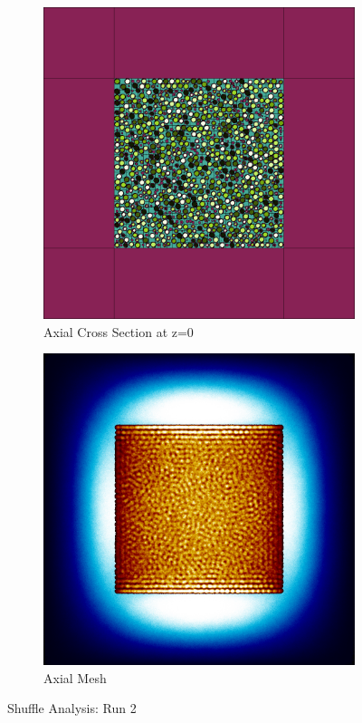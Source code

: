 \begin{figure}[H]
\begin{subfigure}{0.45\textwidth}
  \includegraphics[width=0.95\linewidth]{figures/2345601/2345601-v}
  \caption{Axial Cross Section at z=0 }
  \label{fig:2345601-v}
\end{subfigure}
%
\begin{subfigure}{0.45\textwidth}
  \includegraphics[width=0.95\linewidth]{figures/2345601/2345601-vm}
  \caption{Axial Mesh}
  \label{fig:2345601-vm}
\end{subfigure}
%
\caption{Shuffle Analysis: Run 2}
\label{fig:2345601}
\end{figure}
